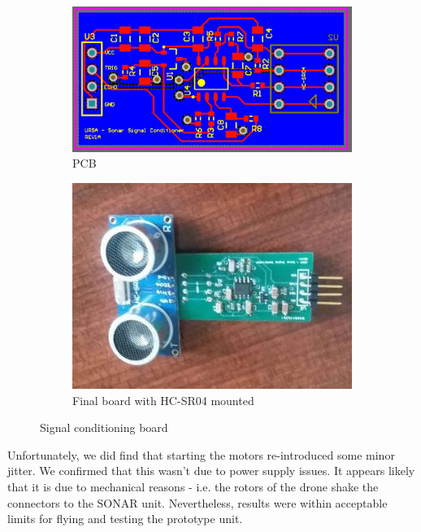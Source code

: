 \documentclass[capstone_report.tex]{subfiles}
\begin{document}
    \begin{figure}[H]
        \centering
        \begin{subfigure}[b]{0.45\textwidth}
            \centering
            \includegraphics[width=\textwidth]{./imgs/sonar_conditioning.jpg}
            \caption{PCB}
            \label{fig:ultrasound_pcb}
        \end{subfigure}%
        \hfill
        \begin{subfigure}[b]{0.45\textwidth}
            \centering
            \includegraphics[width=\textwidth]{./imgs/signal_board.jpg}
            \caption{Final board with HC-SR04 mounted}
            \label{fig:ultrasound_physical}
        \end{subfigure}
        \caption{Signal conditioning board}
    \end{figure}

Unfortunately, we did find that starting the motors re-introduced some minor jitter. We confirmed that this wasn't due to power supply issues. It appears likely that it is due to mechanical reasons - i.e. the rotors of the drone shake the connectors to the SONAR unit. Nevertheless, results were within acceptable limits for flying and testing the prototype unit.
\end{document}
